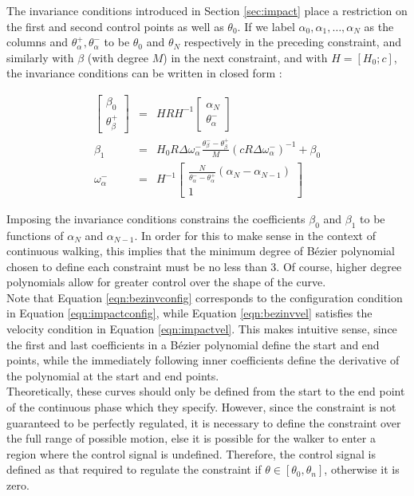 The invariance conditions introduced in Section \ref{sec:impact} place a restriction on the first and second control points as well as $\theta_0$. If we label $\alpha_0, \alpha_1, \ldots, \alpha_N$ as the columns and $\theta_\alpha^+, \theta_\alpha^-$ to be $\theta_0$ and $\theta_N$ respectively in the preceding constraint, and similarly with $\beta$ (with degree $M$) in the next constraint, and with $H = [H_0; c]$, the invariance conditions can be written in closed form \cite{westervelt2007feedback}:

\begin{eqnarray}
	\begin{bmatrix}
	 \beta_0 \\ \theta_\beta^+
	\end{bmatrix}
	&=& HRH^{-1} \begin{bmatrix}
		\alpha_N \\ \theta_\alpha^-
	\end{bmatrix} \label{eqn:bezinvconfig} \\
	\beta_1 &=& H_0R\Delta\omega_\alpha^-\frac{\theta_\beta^- - \theta_\beta^+}{M}(cR\Delta\omega_\alpha^-)^{-1} + \beta_0 \label{eqn:bezinvvel} \\
	\omega_\alpha^- &=& H^{-1}\begin{bmatrix}
		\frac{N}{\theta_\alpha^- - \theta_\alpha^+}(\alpha_N - \alpha_{N-1}) \\ 1
	\end{bmatrix}
\end{eqnarray}

Imposing the invariance conditions constrains the coefficients $\beta_0$ and $\beta_1$ to be functions of $\alpha_N$ and $\alpha_{N-1}$. In order for this to make sense in the context of continuous walking, this implies that the minimum degree of Bézier polynomial chosen to define each constraint must be no less than 3. Of course, higher degree polynomials allow for greater control over the shape of the curve. \\

Note that Equation \ref{eqn:bezinvconfig} corresponds to the configuration condition in Equation \ref{eqn:impactconfig}, while Equation \ref{eqn:bezinvvel} satisfies the velocity condition in Equation \ref{eqn:impactvel}. This makes intuitive sense, since the first and last coefficients in a Bézier polynomial define the start and end points, while the immediately following inner coefficients define the derivative of the polynomial at the start and end points. \\

Theoretically, these curves should only be defined from the start to the end point of the continuous phase which they specify. However, since the constraint is not guaranteed to be perfectly regulated, it is necessary to define the constraint over the full range of possible motion, else it is possible for the walker to enter a region where the control signal is undefined. Therefore, the control signal is defined as that required to regulate the constraint if $\theta \in [\theta_0, \theta_n]$, otherwise it is zero.\\